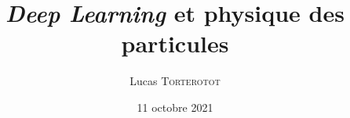 \documentclass[10pt,aspectratio=169]{beamer}
\institute[L. Raspail]{Lycée Raspail -- Paris} %
\title{\textbf{\emph{Deep Learning} et physique des particules}}
\author[Lucas \textsc{Torterotot} -- \mailto{lucas.torterotot@gmail.com}]{Lucas \textsc{Torterotot}}
\date{11 octobre 2021}
\begin{document}
\def\mythousandsep{\,}

%
%
%
%
%
%
%
%
%
%
%
%
%
\end{document}
